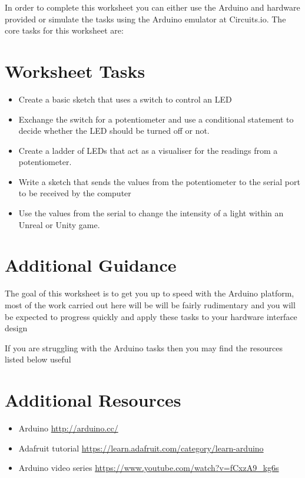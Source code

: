 \documentclass{../../../fal_assignment}
\begin{document}
In order to complete this worksheet you can either use the Arduino and hardware provided or simulate the tasks using the Arduino emulator at Circuits.io. The core tasks for this worksheet are:

\section*{Worksheet Tasks}
\begin{itemize}
	\item Create a basic sketch that uses a switch to control an LED
	\item Exchange the switch for a potentiometer and use a conditional statement to decide whether the LED should be turned off or not.
	\item Create a ladder of LEDs that act as a visualiser for the readings from a potentiometer.
	\item Write a sketch that sends the values from the potentiometer to the serial port to be received by the computer
	\item Use the values from the serial to change the intensity of a light within an Unreal or Unity game. 
\end{itemize}


\section*{Additional Guidance}

The goal of this worksheet is to get you up to speed with the Arduino platform, most of the work carried out here will be will be fairly rudimentary and you will be expected to progress quickly and apply these tasks to your hardware interface design

If you are struggling with the Arduino tasks then you may find the resources listed below useful

\section*{Additional Resources}

\begin{itemize}
    \item Arduino \url{http://arduino.cc/}
    \item Adafruit tutorial \url{https://learn.adafruit.com/category/learn-arduino}
    \item Arduino video series \url{https://www.youtube.com/watch?v=fCxzA9_kg6s}
\end{itemize}
\end{document}
